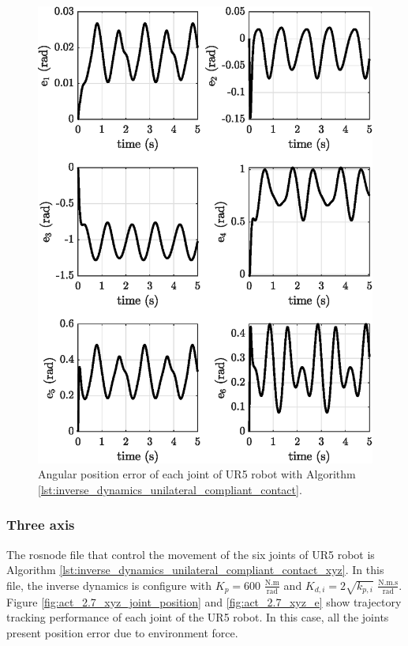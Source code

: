 	
\begin{figure}[H]
    \centering
    \includegraphics{images/act_2.7_z/e.eps}
    \caption{Angular position error of each joint of UR5 robot with Algorithm \ref{lst:inverse_dynamics_unilateral_compliant_contact}.}
    \label{fig:act_2.7_e}
\end{figure}


\subsubsection{Three axis}
The rosnode file that control the movement of the six joints of UR5 robot is Algorithm \ref{lst:inverse_dynamics_unilateral_compliant_contact_xyz}. In this file, the inverse dynamics is configure with $K_p=600$ $\mathrm{\frac{N.m}{rad}}$ and $K_{d,i}=2\sqrt{k_{p,i}}$ $\mathrm{\frac{N.m.s}{rad}}$. Figure \ref{fig:act_2.7_xyz_joint_position} and \ref{fig:act_2.7_xyz_e} show trajectory tracking performance of each joint of the UR5 robot. In this case, all the joints present position error due to environment force.

